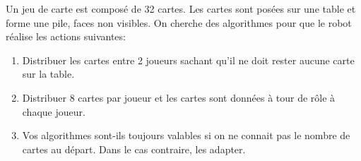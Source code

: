 \documentclass[11pt,a4paper]{article}
\begin{document}
Un jeu de carte est composé de 32 cartes. Les cartes sont posées sur une table et forme une pile, faces non visibles. On cherche des algorithmes pour que le robot  réalise les actions suivantes:

\begin{enumerate}
\item Distribuer les cartes entre 2 joueurs sachant qu'il ne doit rester aucune carte sur la table.

\item Distribuer 8 cartes par joueur et les cartes sont données à tour de rôle à chaque joueur.

\item Vos algorithmes sont-ils toujours valables si on ne connait pas le nombre de cartes au départ. Dans le cas contraire, les adapter.
\end{enumerate}
\end{document}
